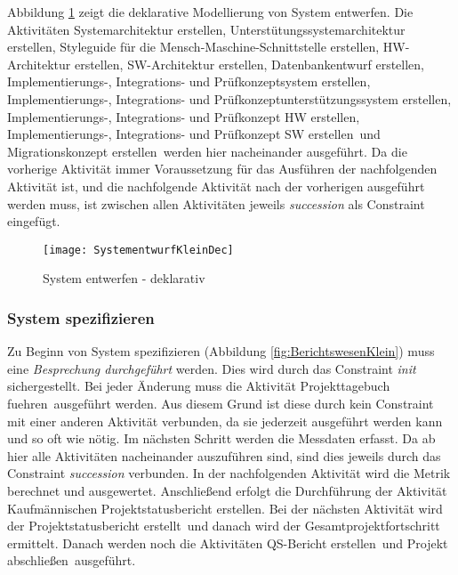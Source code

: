 {Abbildung \ref{fig:SystementwurfKleinDec} zeigt die deklarative Modellierung von System entwerfen.\newline
Die Aktivitäten \grqq Systemarchitektur erstellen, Unterstütungssystemarchitektur erstellen, Styleguide für die Mensch-Maschine-Schnittstelle erstellen, HW-Architektur erstellen, SW-Architektur erstellen, Datenbankentwurf erstellen, Implementierungs-, Integrations- und Prüfkonzeptsystem erstellen, Implementierungs-, Integrations- und Prüfkonzeptunterstützungssystem erstellen, Implementierungs-, Integrations- und Prüfkonzept HW erstellen, Implementierungs-, Integrations- und Prüfkonzept SW erstellen\grqq \ und \grqq Migrationskonzept erstellen\grqq \ werden hier nacheinander ausgeführt. Da die vorherige Aktivität immer Voraussetzung für das Ausführen der nachfolgenden Aktivität ist, und die nachfolgende Aktivität nach der vorherigen ausgeführt werden muss, ist zwischen allen Aktivitäten jeweils \textit{succession} als Constraint eingefügt.

\begin{figure}[!htbp]
\begin{center}
  \texttt{[image: SystementwurfKleinDec]} %
  \caption{System entwerfen - deklarativ}
  \label{fig:SystementwurfKleinDec}
\end{center}
\end{figure}

\subsubsection{System spezifizieren}


Zu Beginn von System spezifizieren (Abbildung \ref{fig:BerichtswesenKlein}) muss eine \textit{Besprechung durchgeführt} werden. Dies wird durch das Constraint \textit{init} sichergestellt. Bei jeder Änderung muss die Aktivität \grqq Projekttagebuch fuehren\grqq \ ausgeführt werden. Aus diesem Grund ist diese durch kein Constraint mit einer anderen Aktivität verbunden, da sie jederzeit ausgeführt werden kann und so oft wie nötig.
Im nächsten Schritt werden die \grqq Messdaten erfasst\grqq. Da ab hier alle Aktivitäten nacheinander auszuführen sind, sind dies jeweils durch das Constraint \textit{succession} verbunden.\newline
In der nachfolgenden Aktivität wird die \grqq Metrik berechnet und ausgewertet\grqq.\newline
Anschließend erfolgt die Durchführung der Aktivität \grqq Kaufmännischen Projektstatusbericht erstellen\grqq.\newline
Bei der nächsten Aktivität wird der \grqq Projektstatusbericht erstellt\grqq \ und danach wird der \grqq Gesamtprojektfortschritt ermittelt\grqq.
Danach werden noch die Aktivitäten \grqq QS-Bericht erstellen\grqq \ und \grqq Projekt abschließen\grqq \ ausgeführt.

}
